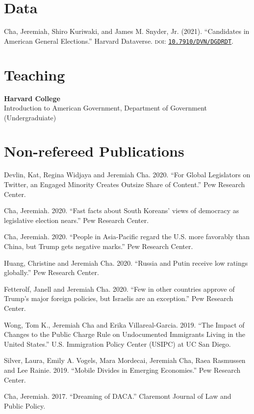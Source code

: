 \documentclass[margin, line]{res}
\begin{document}
\begin{resume}
\section{Data}
\begin{etaremune}
	\item Cha, Jeremiah, Shiro Kuriwaki, and James M. Snyder, Jr. (2021). ``Candidates in American General Elections.'' Harvard Dataverse. \textsc{doi}: \href{https://doi.org/10.7910/DVN/DGDRDT}{\texttt{10.7910/DVN/DGDRDT}}.
\end{etaremune}

\section{Teaching}
\textbf{Harvard College}\\
Introduction to American Government, Department of Government (Undergraduiate) 

\section{Non-refereed Publications}
\begin{etaremune}
	\item Devlin, Kat, Regina Widjaya and Jeremiah Cha. 2020. ``For Global Legislators on Twitter, an Engaged Minority Creates Outsize Share of Content.'' Pew Research Center.
	\item Cha, Jeremiah. 2020. ``Fast facts about South Koreans’ views of democracy as legislative election nears.'' Pew Research Center.
	\item Cha, Jeremiah. 2020. ``People in Asia-Pacific regard the U.S. more favorably than China, but Trump gets negative marks.'' Pew Research Center.
	\item Huang, Christine and Jeremiah Cha. 2020. ``Russia and Putin receive low ratings globally.'' Pew Research Center.
	\item Fetterolf, Janell and Jeremiah Cha. 2020. ``Few in other countries approve of Trump’s major foreign policies, but Israelis are an exception.'' Pew Research Center.
	\item Wong, Tom K., Jeremiah Cha and Erika Villareal-Garcia. 2019. ``The Impact of Changes to the Public Charge Rule on Undocumented Immigrants Living in the United States.'' U.S. Immigration Policy Center (USIPC) at UC San Diego.
	\item Silver, Laura, Emily A. Vogels, Mara Mordecai, Jeremiah Cha, Raea Rasmussen and Lee Rainie. 2019. ``Mobile Divides in Emerging Economies.'' Pew Research Center.
	\item Cha, Jeremiah. 2017. ``Dreaming of DACA.'' Claremont Journal of Law and Public Policy.
\end{etaremune}



\end{resume}
\end{document}
